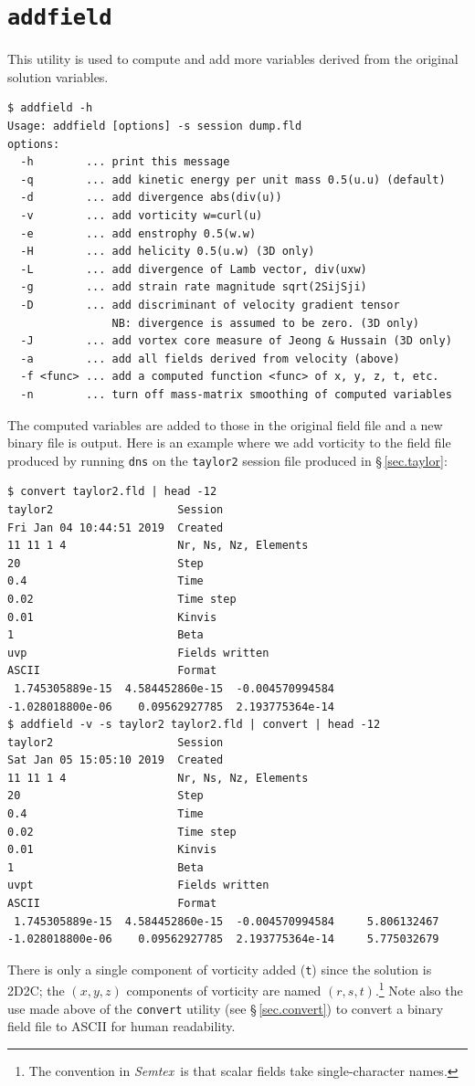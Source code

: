 \documentclass[11pt]{report}
\newcommand{\Semtex}{\emph{Semtex}} \newcommand{\Dog}{\emph{Dog}}
\begin{document}
\section{\texttt{addfield}}
\label{sec.addfield}

This utility is used to compute and add more variables derived from
the original solution variables.
{\small
\begin{verbatim}
$ addfield -h
Usage: addfield [options] -s session dump.fld
options:
  -h        ... print this message
  -q        ... add kinetic energy per unit mass 0.5(u.u) (default)
  -d        ... add divergence abs(div(u))
  -v        ... add vorticity w=curl(u)
  -e        ... add enstrophy 0.5(w.w)
  -H        ... add helicity 0.5(u.w) (3D only)
  -L        ... add divergence of Lamb vector, div(uxw)
  -g        ... add strain rate magnitude sqrt(2SijSji)
  -D        ... add discriminant of velocity gradient tensor
                NB: divergence is assumed to be zero. (3D only)
  -J        ... add vortex core measure of Jeong & Hussain (3D only)
  -a        ... add all fields derived from velocity (above)
  -f <func> ... add a computed function <func> of x, y, z, t, etc.
  -n        ... turn off mass-matrix smoothing of computed variables
\end{verbatim}
}
%
The computed variables are added to those in the original field file
and a new binary file is output.  Here is an example where we add
vorticity to the field file produced by running \verb|dns| on the
\verb|taylor2| session file produced in \S\,\ref{sec.taylor}:
{\small
\begin{verbatim}
$ convert taylor2.fld | head -12
taylor2                   Session
Fri Jan 04 10:44:51 2019  Created
11 11 1 4                 Nr, Ns, Nz, Elements
20                        Step
0.4                       Time
0.02                      Time step
0.01                      Kinvis
1                         Beta
uvp                       Fields written
ASCII                     Format
 1.745305889e-15  4.584452860e-15  -0.004570994584
-1.028018800e-06    0.09562927785  2.193775364e-14
$ addfield -v -s taylor2 taylor2.fld | convert | head -12
taylor2                   Session
Sat Jan 05 15:05:10 2019  Created
11 11 1 4                 Nr, Ns, Nz, Elements
20                        Step
0.4                       Time
0.02                      Time step
0.01                      Kinvis
1                         Beta
uvpt                      Fields written
ASCII                     Format
 1.745305889e-15  4.584452860e-15  -0.004570994584     5.806132467
-1.028018800e-06    0.09562927785  2.193775364e-14     5.775032679
\end{verbatim}
}
\noindent
There is only a single component of vorticity added (\verb|t|) since
the solution is 2D2C; the $(x,y,z)$ components of vorticity are named
$(r,s,t)$.\footnote{The convention in \Semtex\ is that scalar fields
  take single-character names.} Note also the use made above of the
\verb|convert| utility (see \S\,\ref{sec.convert}) to convert a binary
field file to ASCII for human readability.
\end{document}
